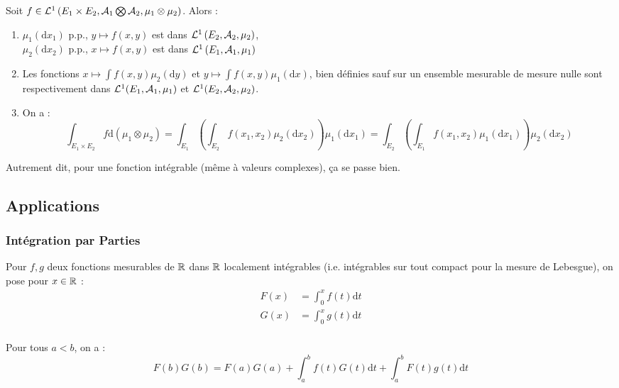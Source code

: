 \documentclass{cours}
\begin{document}
\begin{theorem}
    Soit $f \in \mathcal{L}^{1}\left(E_{1} \times E_{2}, \mathcal{A}_{1} \bigotimes \mathcal{A}_{2}, \mu_{1}\otimes\mu_{2}\right)$. Alors :
    \begin{enumerate}
        \item $\mu_{1}(\mathrm{d}x_{1})$ p.p., $y \mapsto f(x, y)$ est dans $\mathcal{L}^{1}\left(E_{2}, \mathcal{A}_{2}, \mu_{2}\right)$,\\
              $\mu_{2}(\mathrm{d}x_{2})$ p.p., $x \mapsto f(x, y)$ est dans $\mathcal{L}^{1}\left(E_{1}, \mathcal{A}_{1}, \mu_{1}\right)$
        \item Les fonctions $x \mapsto \int f(x, y) \mu_{2}(\mathrm{d}y)$ et $y \mapsto \int f(x, y)\mu_{1}\left(\mathrm{d}x\right)$, bien définies sauf sur un ensemble mesurable de mesure nulle sont respectivement dans $\mathcal{L}^{1}(E_{1}, \mathcal{A}_{1}, \mu_{1})$ et $\mathcal{L}^{1}(E_{2}, \mathcal{A}_{2}, \mu_{2})$.
        \item On a :
              \[
                  \int_{E_{1} \times E_{2}} f \mathrm{d}\left(\mu_{1}\otimes\mu_{2}\right) = \int_{E_{1}}\left(\int_{E_{2}}f(x_{1}, x_{2})\mu_{2}(\mathrm{d}x_{2})\right) \mu_{1}\left(\mathrm{d}x_{1}\right) = \int_{E_{2}}\left(\int_{E_{1}}f(x_{1}, x_{2})\mu_{1}(\mathrm{d}x_{1})\right) \mu_{2}\left(\mathrm{d}x_{2}\right)
              \]
    \end{enumerate}
\end{theorem}
Autrement dit, pour une fonction intégrable (même à valeurs complexes), ça se passe bien.

\subsection{Applications}
\subsubsection{Intégration par Parties}
\begin{definition}
    Pour $f, g$ deux fonctions mesurables de $\mathbb{R}$ dans $\mathbb{R}$ localement intégrables (i.e. intégrables sur tout compact pour la mesure de Lebesgue), on pose pour $x \in \mathbb{R}$ :
    \[
        \begin{aligned}
            F(x) & = \int_{0}^{x}f(t)\mathrm{d}t \\
            G(x) & = \int_{0}^{x}g(t)\mathrm{d}t \\
        \end{aligned}
    \]
\end{definition}
\begin{theorem}[IPP]
    Pour tous $a < b$, on a :
    \[
        F(b)G(b) = F(a)G(a) + \int_{a}^{b}f(t)G(t)\mathrm{d}t + \int_{a}^{b}F(t)g(t)\mathrm{d}t
    \]
\end{theorem}
\end{document}
